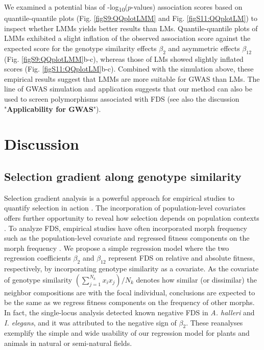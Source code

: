 \documentclass[12pt,]{article}
\begin{document}
We examined a potential bias of -log\textsubscript{10}($p$-values) association scores based on quantile-quantile plots (Fig. \ref{figS9:QQplotLMM} and Fig. \ref{figS11:QQplotLM}) to inspect whether LMMs yields better results than LMs. Quantile-quantile plots of LMMs exhibited a slight inflation of the observed association score against the expected score for the genotype similarity effects $\beta_2$ and asymmetric effects $\beta_{12}$ (Fig. \ref{figS9:QQplotLMM}b-c), whereas those of LMs showed slightly inflated scores (Fig. \ref{figS11:QQplotLM}b-c). Combined with the simulation above, these empirical results suggest that LMMs are more suitable for GWAS than LMs. The line of GWAS simulation and application suggests that our method can also be used to screen polymorphisms associated with FDS (see also the discussion "\textbf{Applicability for GWAS}").

\section{Discussion}

\subsection{Selection gradient along genotype similarity}
Selection gradient analysis is a powerful approach for empirical studies to quantify selection in action \citep{lande1983measurement, mitchell1987regression, chong2018note}. The incorporation of population-level covariates offers further opportunity to reveal how selection depends on population contexts \citep{heisler1987method}. To analyze FDS, empirical studies have often incorporated morph frequency such as the population-level covariate and regressed fitness components on the morph frequency \citep{gigord2001negative, mccauley1998frequency, calsbeek2010geographic, sato2017herbivore}. We propose a simple regression model where the two regression coefficients $\beta_2$ and $\beta_{12}$ represent FDS on relative and absolute fitness, respectively, by incorporating genotype similarity as a covariate. As the covariate of genotype similarity $(\sum^{N_k}_{j=1}x_i x_j)/N_k$ denotes how similar (or dissimilar) the neighbor compositions are with the focal individual, conclusions are expected to be the same as we regress fitness components on the frequency of other morphs. In fact, the single-locus analysis detected known negative FDS in \textit{A. halleri} and \textit{I. elegans}, and it was attributed to the negative sign of $\beta_2$. These reanalyses exemplify the simple and wide usability of our regression model for plants and animals in natural or semi-natural fields. 
\end{document}
